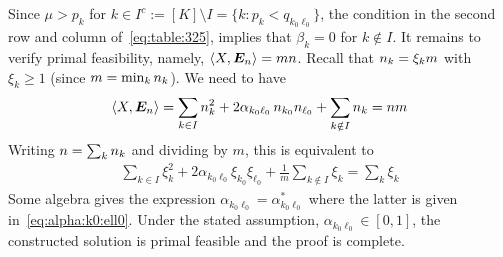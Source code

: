   Since $\mu > p_k$ for $k \in I^c := [K] \setminus I = \{ k: p_k < q_{k_0\ell_0}\}$, the condition in the second row and column of~\eqref{eq:table:325}, implies that $\beta_k = 0$ for $k \notin I$. It remains to verify primal feasibility, namely, $\langle X,\bm{E}_n\rangle = m n$. Recall that $n_k = \xi_k m$ with $\xi_k \ge 1$ (since $m = \min_k n_k$). We need to have
  \begin{align*}
    \langle X,\bm{E}_n\rangle = \sum_{k \in I} n_k^2 + 2 \alpha_{k_0 \ell_0} \,n_{k_0} n_{\ell_0} + \sum_{k \notin I} n_k = n m
  \end{align*}
  Writing $n = \sum_{k} n_k$ and dividing by $m$, this is equivalent to
  \begin{align*}
    \sum_{k \in I} \xi_k^2 + 2 \alpha_{k_0 \ell_0} \xi_{k_0} \xi_{\ell_0} + \frac1 m \sum_{k \notin I} \xi_k = \sum_k \xi_k
  \end{align*}
  Some algebra gives the expression $\alpha_{k_0 \ell_0} = \alpha^*_{k_0 \ell_0}$ where the latter is given in~\eqref{eq:alpha:k0:ell0}.
  Under the stated assumption, $\alpha_{k_0 \ell_0} \in [0,1]$, the constructed solution is primal feasible and the proof is complete. 










